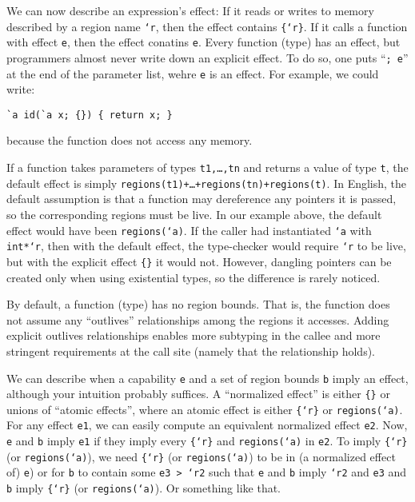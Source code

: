 We can now describe an expression's effect: If it reads or writes to
memory described by a region name \texttt{`r}, then the effect
contains \texttt{\{`r\}}.  If it calls a function with effect
\texttt{e}, then the effect conatins \texttt{e}.  Every function
(type) has an effect, but programmers almost never write down an
explicit effect.  To do so, one puts ``\texttt{; e}'' at the end of
the parameter list, wehre \texttt{e} is an effect.  For example, we
could write:
\begin{verbatim}
`a id(`a x; {}) { return x; }
\end{verbatim}
because the function does not access any memory.

If a function takes parameters of types \texttt{t1,\dots,tn} and
returns a value of type \texttt{t}, the default effect is simply
\texttt{regions(t1)+\dots+regions(tn)+regions(t)}.  In English, the
default assumption is that a function may dereference any pointers it
is passed, so the corresponding regions must be live.  In our example
above, the default effect would have been \texttt{regions(`a)}.  If
the caller had instantiated \texttt{`a} with \texttt{int*`r}, then
with the default effect, the type-checker would require \texttt{`r} to
be live, but with the explicit effect \texttt{\{\}} it would not.
However, dangling pointers can be created only when using existential
types, so the difference is rarely noticed.

By default, a function (type) has no region bounds.  That is, the
function does not assume any ``outlives'' relationships among the
regions it accesses.  Adding explicit outlives relationships enables
more subtyping in the callee and more stringent requirements at the
call site (namely that the relationship holds).

We can describe when a capability \texttt{e} and a set of region
bounds \texttt{b} imply an effect, although your intuition probably
suffices.  A ``normalized effect'' is either \texttt{\{\}} or unions
of ``atomic effects'', where an atomic effect is either
\texttt{\{`r\}} or \texttt{regions(`a)}.  For any effect \texttt{e1},
we can easily compute an equivalent normalized effect \texttt{e2}.
Now, \texttt{e} and \texttt{b} imply \texttt{e1} if they imply every
\texttt{\{`r\}} and \texttt{regions(`a)} in \texttt{e2}.  To imply
\texttt{\{`r\}} (or \texttt{regions(`a)}), we need \texttt{\{`r\}} (or
\texttt{regions(`a)}) to be in (a normalized effect of) \texttt{e}) or
for \texttt{b} to contain some \texttt{e3 > `r2} such that \texttt{e}
and \texttt{b} imply \texttt{`r2} and \texttt{e3} and \texttt{b} imply
\texttt{\{`r\}} (or \texttt{regions(`a)}).  Or something like that.

